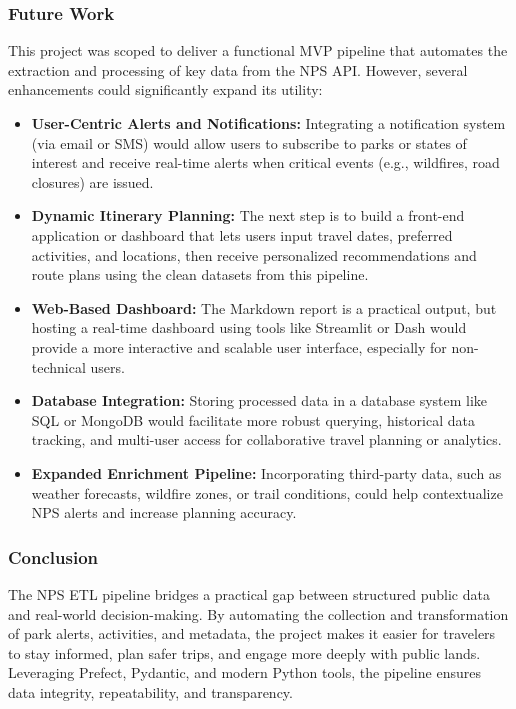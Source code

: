 \documentclass[
  letterpaper,
  DIV=11,
  numbers=noendperiod]{scrartcl}
\providecommand{\tightlist}{%
  \setlength{\itemsep}{0pt}\setlength{\parskip}{0pt}}\usepackage{longtable,booktabs,array}
\begin{document}
\subsubsection{Future Work}\label{future-work}

This project was scoped to deliver a functional MVP pipeline that
automates the extraction and processing of key data from the NPS API.
However, several enhancements could significantly expand its utility:

\begin{itemize}
\tightlist
\item
  \textbf{User-Centric Alerts and Notifications:} Integrating a
  notification system (via email or SMS) would allow users to subscribe
  to parks or states of interest and receive real-time alerts when
  critical events (e.g., wildfires, road closures) are issued.
\item
  \textbf{Dynamic Itinerary Planning:} The next step is to build a
  front-end application or dashboard that lets users input travel dates,
  preferred activities, and locations, then receive personalized
  recommendations and route plans using the clean datasets from this
  pipeline.
\item
  \textbf{Web-Based Dashboard:} The Markdown report is a practical
  output, but hosting a real-time dashboard using tools like Streamlit
  or Dash would provide a more interactive and scalable user interface,
  especially for non-technical users.
\item
  \textbf{Database Integration:} Storing processed data in a database
  system like SQL or MongoDB would facilitate more robust querying,
  historical data tracking, and multi-user access for collaborative
  travel planning or analytics.
\item
  \textbf{Expanded Enrichment Pipeline:} Incorporating third-party data,
  such as weather forecasts, wildfire zones, or trail conditions, could
  help contextualize NPS alerts and increase planning accuracy.
\end{itemize}

\subsubsection{Conclusion}\label{conclusion}

The NPS ETL pipeline bridges a practical gap between structured public
data and real-world decision-making. By automating the collection and
transformation of park alerts, activities, and metadata, the project
makes it easier for travelers to stay informed, plan safer trips, and
engage more deeply with public lands. Leveraging Prefect, Pydantic, and
modern Python tools, the pipeline ensures data integrity, repeatability,
and transparency.
\end{document}
